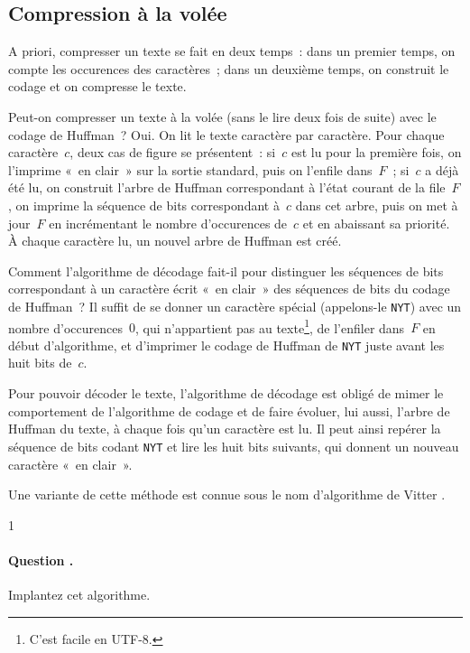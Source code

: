 \documentclass[12pt]{article}
\newcounter{question_counter}
\newcommand{\question}{\addtocounter{question_counter}1 %
    \paragraph{\bf Question \arabic{question_counter}.}}
\newcounter{points_counter}
\newcounter{section_points_counter}
\begin{document}
\subsection*{Compression à la volée}

A priori, compresser un texte se fait en deux temps~: dans un premier
temps, on compte les occurences des caractères~; dans un deuxième temps,
on construit le codage et on compresse le texte.

Peut-on compresser un texte à la volée (sans le lire deux fois de suite)
avec le codage de Huffman~? Oui. On lit le texte caractère par caractère.
Pour chaque caractère~$c$, deux cas de figure se présentent~: si~$c$ est
lu pour la première fois, on l'imprime «~en clair~» sur la sortie standard,
puis on l'enfile dans~$F$~; si~$c$ a déjà été lu, on construit l'arbre
de Huffman correspondant à l'état courant de la file~$F$, on imprime
la séquence de bits correspondant à~$c$ dans cet arbre, puis on met à jour~$F$
en incrémentant le nombre d'occurences de~$c$ et en abaissant sa priorité.
À chaque caractère lu, un nouvel arbre de Huffman est créé.

Comment l'algorithme de décodage fait-il pour distinguer les séquences
de bits correspondant à un caractère écrit «~en clair~» des séquences
de bits du codage de Huffman~? Il suffit de se donner un caractère
spécial (appelons-le {\tt NYT}) avec un nombre d'occurences~$0$, 
qui n'appartient pas au texte\footnote{C'est facile en UTF-8.}, 
de l'enfiler dans~$F$ en début d'algorithme, et d'imprimer le codage 
de Huffman de {\tt NYT} juste avant les huit bits de~$c$.

Pour pouvoir décoder le texte, l'algorithme de décodage est obligé de
mimer le comportement de l'algorithme de codage et de faire évoluer, lui
aussi, l'arbre de Huffman du texte, à chaque fois qu'un caractère est lu.
Il peut ainsi repérer la séquence de bits codant {\tt NYT} et lire
les huit bits suivants, qui donnent un nouveau caractère
«~en clair~».

Une variante de cette méthode est connue sous le nom d'algorithme de Vitter
\cite{Vitter87}.

\question
Implantez cet algorithme.



\end{document}
